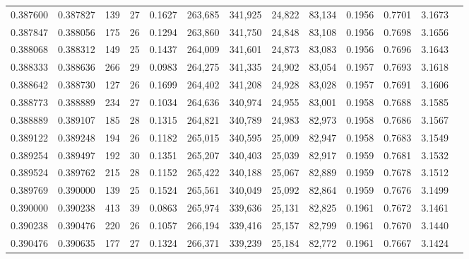 \begin{tabular}{rrrrrrrrrrrrr}
0.387600 & 0.387827 &    139 &    27 &                                     0.1627 & 263,685 & 341,925 &  24,822 &  83,134 & 0.1956 & 0.7701 & 3.1673 \\
0.387847 & 0.388056 &    175 &    26 &                                     0.1294 & 263,860 & 341,750 &  24,848 &  83,108 & 0.1956 & 0.7698 & 3.1656 \\
0.388068 & 0.388312 &    149 &    25 &                                     0.1437 & 264,009 & 341,601 &  24,873 &  83,083 & 0.1956 & 0.7696 & 3.1643 \\
0.388333 & 0.388636 &    266 &    29 &                                     0.0983 & 264,275 & 341,335 &  24,902 &  83,054 & 0.1957 & 0.7693 & 3.1618 \\
0.388642 & 0.388730 &    127 &    26 &                                     0.1699 & 264,402 & 341,208 &  24,928 &  83,028 & 0.1957 & 0.7691 & 3.1606 \\
0.388773 & 0.388889 &    234 &    27 &                                     0.1034 & 264,636 & 340,974 &  24,955 &  83,001 & 0.1958 & 0.7688 & 3.1585 \\
0.388889 & 0.389107 &    185 &    28 &                                     0.1315 & 264,821 & 340,789 &  24,983 &  82,973 & 0.1958 & 0.7686 & 3.1567 \\
0.389122 & 0.389248 &    194 &    26 &                                     0.1182 & 265,015 & 340,595 &  25,009 &  82,947 & 0.1958 & 0.7683 & 3.1549 \\
0.389254 & 0.389497 &    192 &    30 &                                     0.1351 & 265,207 & 340,403 &  25,039 &  82,917 & 0.1959 & 0.7681 & 3.1532 \\
0.389524 & 0.389762 &    215 &    28 &                                     0.1152 & 265,422 & 340,188 &  25,067 &  82,889 & 0.1959 & 0.7678 & 3.1512 \\
0.389769 & 0.390000 &    139 &    25 &                                     0.1524 & 265,561 & 340,049 &  25,092 &  82,864 & 0.1959 & 0.7676 & 3.1499 \\
0.390000 & 0.390238 &    413 &    39 &                                     0.0863 & 265,974 & 339,636 &  25,131 &  82,825 & 0.1961 & 0.7672 & 3.1461 \\
0.390238 & 0.390476 &    220 &    26 &                                     0.1057 & 266,194 & 339,416 &  25,157 &  82,799 & 0.1961 & 0.7670 & 3.1440 \\
0.390476 & 0.390635 &    177 &    27 &                                     0.1324 & 266,371 & 339,239 &  25,184 &  82,772 & 0.1961 & 0.7667 & 3.1424 \\

\end{tabular}

